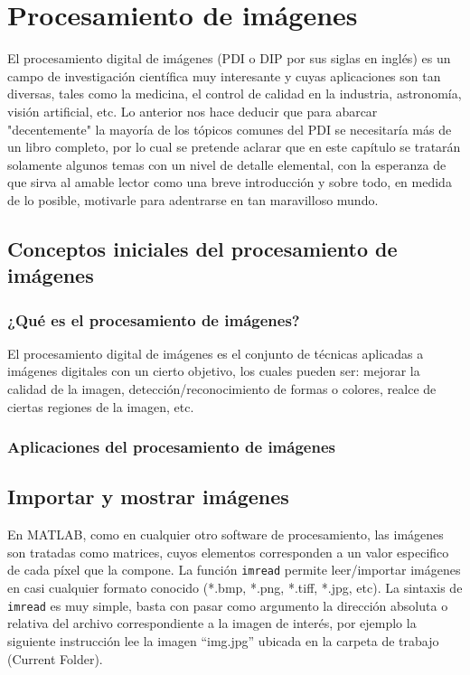 \chapter{Procesamiento de imágenes}

El procesamiento digital de imágenes (PDI o DIP por sus siglas en inglés) es un campo de 
investigación científica muy interesante y cuyas aplicaciones son tan diversas, tales 
como la medicina, el control de calidad en la industria, astronomía, visión artificial, etc. 
Lo anterior nos hace deducir que para abarcar "decentemente" la mayoría de los tópicos 
comunes del PDI se necesitaría más de un libro completo, por lo cual se pretende aclarar 
que en este capítulo se tratarán solamente algunos temas con un nivel de detalle elemental, 
con la esperanza de que sirva al amable lector como una breve introducción y sobre todo, 
en medida de lo posible, motivarle para adentrarse en tan maravilloso mundo.

\section{Conceptos iniciales del procesamiento de imágenes}

\subsection{¿Qué es el procesamiento de imágenes?}

El procesamiento digital de imágenes  es el conjunto de técnicas aplicadas a imágenes 
digitales con un cierto objetivo, los cuales pueden ser: mejorar la calidad de la imagen, 
detección/reconocimiento de formas o colores, realce de ciertas regiones de la imagen, etc.

\subsection{Aplicaciones del procesamiento de imágenes}
 
\section{Importar y mostrar imágenes}

En MATLAB, como en cualquier otro software de procesamiento, las imágenes son tratadas 
como matrices, cuyos elementos corresponden a un valor especifico de cada píxel que la 
compone. La función \texttt{imread} permite leer/importar imágenes en casi cualquier formato 
conocido (*.bmp, *.png, *.tiff, *.jpg, etc). La sintaxis de \texttt{imread} es muy simple, basta 
con pasar como argumento la dirección absoluta o relativa del archivo correspondiente a 
la imagen de interés, por ejemplo la siguiente instrucción lee la imagen “img.jpg” ubicada 
en la carpeta de trabajo (Current Folder).

